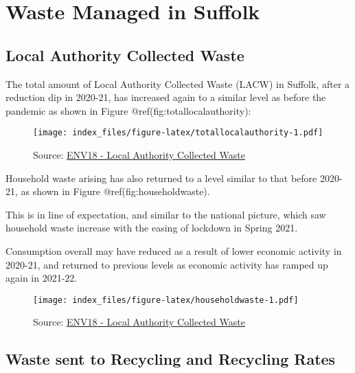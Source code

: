 \documentclass[
]{article}
\begin{document}
\hypertarget{waste-managed-in-suffolk}{%
\section{Waste Managed in Suffolk}\label{waste-managed-in-suffolk}}

\hypertarget{local-authority-collected-waste}{%
\subsection{Local Authority Collected
Waste}\label{local-authority-collected-waste}}

The total amount of Local Authority Collected Waste (LACW) in Suffolk,
after a reduction dip in 2020-21, has increased again to a similar level
as before the pandemic as shown in Figure @ref(fig:totallocalauthority):

\begin{figure}
\centering
\texttt{[image: index\_files/figure-latex/totallocalauthority-1.pdf]}
\caption{\label{fig:totallocalauthority}Source:
\href{https://www.gov.uk/government/statistical-data-sets/env18-local-authority-collected-waste-annual-results-tables}{ENV18
- Local Authority Collected Waste}}
\end{figure}

Household waste arising has also returned to a level similar to that
before 2020-21, as shown in Figure @ref(fig:householdwaste).

This is in line of expectation, and similar to the national picture,
which saw household waste increase with the easing of lockdown in Spring
2021.

Consumption overall may have reduced as a result of lower economic
activity in 2020-21, and returned to previous levels as economic
activity has ramped up again in 2021-22.

\begin{figure}
\centering
\texttt{[image: index\_files/figure-latex/householdwaste-1.pdf]}
\caption{Source:
\href{https://www.gov.uk/government/statistical-data-sets/env18-local-authority-collected-waste-annual-results-tables}{ENV18
- Local Authority Collected Waste}}
\end{figure}

\hypertarget{waste-sent-to-recycling-and-recycling-rates}{%
\subsection{Waste sent to Recycling and Recycling
Rates}\label{waste-sent-to-recycling-and-recycling-rates}}
\end{document}
